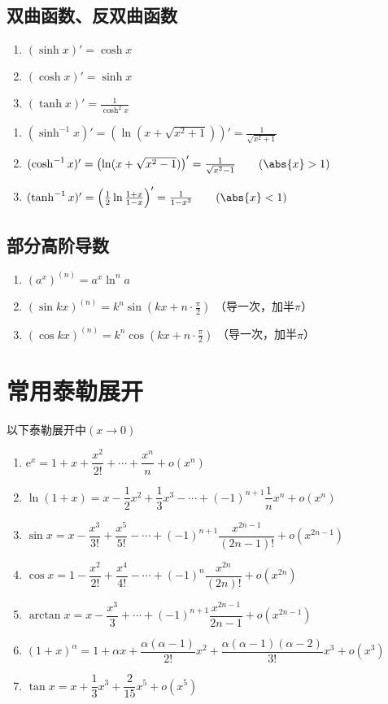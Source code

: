 \subsection{双曲函数、反双曲函数}
\begin{enumerate}
    \item $(\sinh x)' = \cosh x$
    \item $(\cosh x)' = \sinh x$
    \item $(\tanh x)' = \frac{1}{\cosh^2 x}$
\end{enumerate}
\begin{enumerate}[\textcolor{red}{$\bigstar$}]
    \item $(\sinh^{-1} x)' = \left(\ln (x+\sqrt{x^2 + 1})\right)' = \frac{1}{\sqrt{x^2 + 1}}$
    \item $(\cosh^{-1} x)' = \left(\ln (x+\sqrt{x^2 - 1})\right)' = \frac{1}{\sqrt{x^2 - 1}} \qquad (\abs{x} > 1)$
    \item $(\tanh^{-1} x)' = \left(\frac{1}{2}\ln \frac{1+x}{1-x}\right)' = \frac{1}{1-x^2} \qquad (\abs{x} < 1)$
\end{enumerate}

\subsection{部分高阶导数}
\begin{enumerate}
    \item $(a^x)^{(n)} = a^x\ln^n a$
    \item $(\sin kx)^{(n)} = k^n \sin(kx+n\cdot \frac{\pi}{2})$ （导一次，加半$\pi$）
    \item $(\cos kx)^{(n)} = k^n \cos(kx+n\cdot \frac{\pi}{2})$ （导一次，加半$\pi$）
\end{enumerate}

\section{常用泰勒展开}
以下泰勒展开中$(x\to 0)$
\begin{enumerate}
    \item $\mathrm{e}^x = 1 + x + \dfrac{x^2}{2!} + \cdots + \dfrac{x^n}{n} + o(x^n)$
    \item $\ln(1+x) = x - \dfrac{1}{2}x^2 + \dfrac{1}{3}x^3 -\cdots+(-1)^{n+1}\dfrac{1}{n}x^n + o(x^n)$
    \item $\sin x = x-\dfrac{x^3}{3!} + \dfrac{x^5}{5!} -\cdots +(-1)^{n+1}\dfrac{x^{2n-1}}{(2n-1)!}+o(x^{2n-1})$
    \item $\cos x = 1 - \dfrac{x^2}{2!} + \dfrac{x^4}{4!} - \cdots + (-1)^n\dfrac{x^{2n}}{(2n)!} + o(x^{2n})$
    \item $\arctan x = x - \dfrac{x^3}{3} + \cdots +(-1)^{n+1}\dfrac{x^{2n-1}}{2n-1}+o(x^{2n-1})$
    \item $(1+x)^\alpha = 1 + \alpha x +\dfrac{\alpha(\alpha-1)}{2!}x^2 + \dfrac{\alpha(\alpha-1)(\alpha-2)}{3!}x^3 + o(x^3)$
    \item $\tan x = x + \dfrac{1}{3}x^3 + \dfrac{2}{15}x^5 + o(x^5)$
\end{enumerate}

